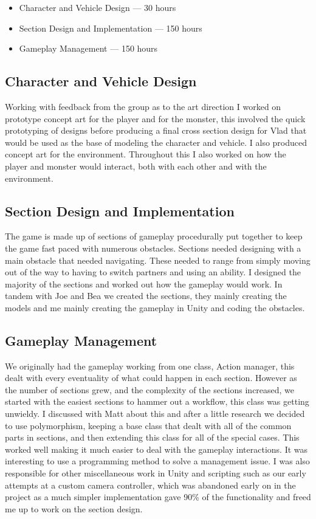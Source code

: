 \documentclass[a4paper,oneside]{memoir}
\begin{document}
			\begin{itemize}
				\item Character and Vehicle Design --- 30 hours
				\item Section Design and Implementation --- 150 hours
				\item Gameplay Management --- 150 hours
			\end{itemize}

			\subsection{Character and Vehicle Design}

				Working with feedback from the group as to the art direction I worked on prototype concept art for the player and for the monster, this involved the quick prototyping of designs before producing a final cross section design for Vlad that would be used as the base of modeling the character and vehicle. 
				I also produced concept art for the environment. 
				Throughout this I also worked on how the player and monster would interact, both with each other and with the environment.  

			\subsection{Section Design and Implementation}	

				The game is made up of sections of gameplay procedurally put together to keep the game fast paced with numerous obstacles. 
				Sections needed designing with a main obstacle that needed navigating. 
				These needed to range from simply moving out of the way to having to switch partners and using an ability. 
				I designed the majority of the sections and worked out how the gameplay would work. 
				In tandem with Joe and Bea we created the sections, they mainly creating the models and me mainly creating the gameplay in Unity and coding the obstacles.

			\subsection{Gameplay Management}
			
				We originally had the gameplay working from one class, Action manager, this dealt with every eventuality of what could happen in each section. 
				However as the number of sections grew, and the complexity of the sections increased, we started with the easiest sections to hammer out a workflow, this class was getting unwieldy. 
				I discussed with Matt about this and after a little research we decided to use polymorphism, keeping a base class that dealt with all of the common parts in sections, and then extending this class for all of the special cases. 
				This worked well making it much easier to deal with the gameplay interactions. 
				It was interesting to use a programming method to solve a management issue. 
				I was also responsible for other miscellaneous work in Unity and scripting such as our early attempts at a custom camera controller, which was abandoned early on in the project as a much simpler implementation gave 90\% of the functionality and freed me up to work on the section design.	
\end{document}
